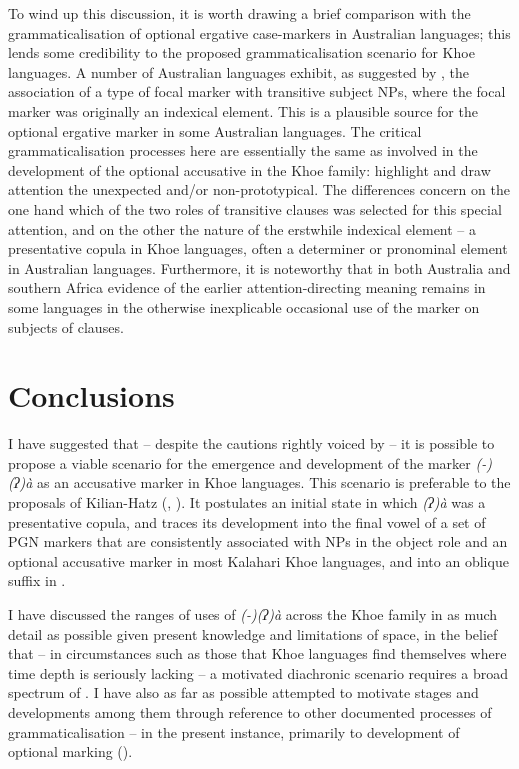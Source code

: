 \documentclass[output=paper]{LSP/langsci}
\begin{document}
To wind up this discussion, it is worth drawing a brief comparison with the grammaticalisation of optional ergative case-markers in Australian languages; this lends some credibility to the proposed grammaticalisation scenario for Khoe languages. A number of Australian languages exhibit, as suggested by \eg \citet{McGregor2010Optional,McGregor2013Optionality,McGregor2017Grammaticalization}, the association of a type of focal marker with transitive subject NPs, where the focal marker was originally an indexical element. This is a plausible source for the optional ergative marker in some Australian languages. The critical grammaticalisation processes here are essentially the same as involved in the development of the optional accusative in the Khoe family: highlight and draw attention the unexpected and/or non-prototypical. The differences concern on the one hand which of the two roles of transitive clauses was selected for this special attention, and on the other the nature of the erstwhile indexical element – a presentative copula in Khoe languages, often a determiner or pronominal element in Australian languages. Furthermore, it is noteworthy that in both Australia and southern Africa evidence of the earlier attention-directing meaning remains in some languages in the otherwise inexplicable occasional use of the marker on subjects of  clauses.

\section{Conclusions}\label{09-mc-sec:5}
I have suggested that – despite the cautions rightly voiced by \citet[319–320]{Fehn2014Grammar} – it is possible to propose a viable scenario for the emergence and development of the marker \textit{(-)(ʔ)à} as an accusative marker in Khoe languages. This scenario is preferable to the proposals of Kilian-Hatz (\citeyear[55]{Kilian-Hatz2008Grammar}, \citeyear[376–378]{Kilian-Hatz2013Kxoe}). It postulates an initial state in which \textit{(ʔ)à} was a presentative copula, and traces its development into the final vowel of a set of PGN markers that are consistently associated with NPs in the object role and an optional accusative marker in most Kalahari Khoe languages, and into an oblique suffix in .

I have discussed the ranges of uses of \textit{(-)(ʔ)à} across the Khoe family in as much detail as possible given present knowledge and limitations of space, in the belief that – in circumstances such as those that Khoe languages find themselves where time depth is seriously lacking – a motivated diachronic scenario requires a broad spectrum of . I have also as far as possible attempted to motivate stages and developments among them through reference to other documented processes of grammaticalisation – in the present instance, primarily to development of optional  marking (\eg \citealt{McGregor2010Optional,McGregor2013Optionality,McGregor2017Grammaticalization}).
\end{document}
